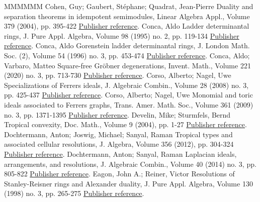 \documentclass[11pt]{article}
\theoremstyle{definition}
\numberwithin{equation}{section}
\begin{document}
\begin{thebibliography}{MMMMMM}
 Cohen, Guy; Gaubert, Stéphane; Quadrat, Jean-Pierre Duality and separation theorems in idempotent semimodules, Linear Algebra Appl., Volume 379 (2004), pp. 395-422 \href{https://alco.centre-mersenne.org/articles/10.5802/alco.404/#cohen+gaubert+quadrat}{Publisher reference}.
 Conca, Aldo Ladder determinantal rings, J. Pure Appl. Algebra, Volume 98 (1995) no. 2, pp. 119-134 \href{https://alco.centre-mersenne.org/articles/10.5802/alco.404/#conca1995}{Publisher reference}.
 Conca, Aldo Gorenstein ladder determinantal rings, J. London Math. Soc. (2), Volume 54 (1996) no. 3, pp. 453-474 \href{https://alco.centre-mersenne.org/articles/10.5802/alco.404/#conca1996gorenstein}{Publisher reference}.
 Conca, Aldo; Varbaro, Matteo Square-free Gröbner degenerations, Invent. Math., Volume 221 (2020) no. 3, pp. 713-730 \href{https://alco.centre-mersenne.org/articles/10.5802/alco.404/#conca2020square}{Publisher reference}.
 Corso, Alberto; Nagel, Uwe Specializations of Ferrers ideals, J. Algebraic Combin., Volume 28 (2008) no. 3, pp. 425-437 \href{https://alco.centre-mersenne.org/articles/10.5802/alco.404/#corso2008specializations}{Publisher reference}.
 Corso, Alberto; Nagel, Uwe Monomial and toric ideals associated to Ferrers graphs, Trans. Amer. Math. Soc., Volume 361 (2009) no. 3, pp. 1371-1395 \href{https://alco.centre-mersenne.org/articles/10.5802/alco.404/#corso2009}{Publisher reference}.
 Develin, Mike; Sturmfels, Bernd Tropical convexity, Doc. Math., Volume 9 (2004), pp. 1-27 \href{https://alco.centre-mersenne.org/articles/10.5802/alco.404/#develin2004tropical}{Publisher reference}.
 Dochtermann, Anton; Joswig, Michael; Sanyal, Raman Tropical types and associated cellular resolutions, J. Algebra, Volume 356 (2012), pp. 304-324 \href{https://alco.centre-mersenne.org/articles/10.5802/alco.404/#dochtermann2012tropical}{Publisher reference}.
 Dochtermann, Anton; Sanyal, Raman Laplacian ideals, arrangements, and resolutions, J. Algebraic Combin., Volume 40 (2014) no. 3, pp. 805-822 \href{https://alco.centre-mersenne.org/articles/10.5802/alco.404/#DocSan}{Publisher reference}.
 Eagon, John A.; Reiner, Victor Resolutions of Stanley-Reisner rings and Alexander duality, J. Pure Appl. Algebra, Volume 130 (1998) no. 3, pp. 265-275 \href{https://alco.centre-mersenne.org/articles/10.5802/alco.404/#eagon1998resolutions}{Publisher reference}.

\end{thebibliography}
\end{document}
